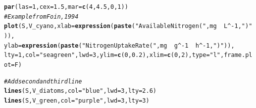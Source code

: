 \documentclass{tufte-handout}\usepackage[]{graphicx}\usepackage[]{xcolor}
\makeatletter
\newcommand{\hlnum}[1]{\textcolor[rgb]{0.686,0.059,0.569}{#1}}%
\newcommand{\hlstr}[1]{\textcolor[rgb]{0.192,0.494,0.8}{#1}}%
\newcommand{\hlcom}[1]{\textcolor[rgb]{0.678,0.584,0.686}{\textit{#1}}}%
\newcommand{\hlopt}[1]{\textcolor[rgb]{0,0,0}{#1}}%
\newcommand{\hlstd}[1]{\textcolor[rgb]{0.345,0.345,0.345}{#1}}%
\newcommand{\hlkwc}[1]{\textcolor[rgb]{0.333,0.667,0.333}{#1}}%
\newcommand{\hlkwd}[1]{\textcolor[rgb]{0.737,0.353,0.396}{\textbf{#1}}}%
\newenvironment{kframe}{%
 \def\at@end@of@kframe{}%
 \ifinner\ifhmode%
  \def\at@end@of@kframe{\end{minipage}}%
  \begin{minipage}{\columnwidth}%
 \fi\fi%
 \def\FrameCommand##1{\hskip\@totalleftmargin \hskip-\fboxsep
 \colorbox{shadecolor}{##1}\hskip-\fboxsep
     \hskip-\linewidth \hskip-\@totalleftmargin \hskip\columnwidth}%
 \MakeFramed {\advance\hsize-\width
   \@totalleftmargin\z@ \linewidth\hsize
   \@setminipage}}%
 {\par\unskip\endMakeFramed%
 \at@end@of@kframe}
\newenvironment{knitrout}{}{} %
\makeatother
\begin{document}
\begin{knitrout}
\color{fgcolor}\begin{kframe}
\begin{alltt}
\hlkwd{par}\hlstd{(}\hlkwc{las}\hlstd{=}\hlnum{1}\hlstd{,} \hlkwc{cex}\hlstd{=}\hlnum{1.5}\hlstd{,} \hlkwc{mar}\hlstd{=}\hlkwd{c}\hlstd{(}\hlnum{4}\hlstd{,}\hlnum{4.5}\hlstd{,}\hlnum{0}\hlstd{,}\hlnum{1}\hlstd{))}
\hlcom{# Example from Foin, 1994}
\hlkwd{plot}\hlstd{(S,V_cyano,} \hlkwc{xlab}\hlstd{=}\hlkwd{expression}\hlstd{(}\hlkwd{paste}\hlstd{(}\hlstr{"Available Nitrogen ("}\hlstd{, mg} \hlopt{~~} \hlstd{L}\hlopt{^-}\hlnum{1}\hlstd{,} \hlstr{")"}\hlstd{)),}
  \hlkwc{ylab}\hlstd{=}\hlkwd{expression}\hlstd{(}\hlkwd{paste}\hlstd{(}\hlstr{"Nitrogen Uptake Rate ( "}\hlstd{, mg} \hlopt{~~} \hlstd{g}\hlopt{^-}\hlnum{1} \hlopt{~~} \hlstd{h}\hlopt{^-}\hlnum{1}\hlstd{,} \hlstr{")"}\hlstd{)),}
        \hlkwc{lty}\hlstd{=}\hlnum{1}\hlstd{,} \hlkwc{col}\hlstd{=}\hlstr{"seagreen"}\hlstd{,} \hlkwc{lwd}\hlstd{=}\hlnum{3}\hlstd{,} \hlkwc{ylim}\hlstd{=}\hlkwd{c}\hlstd{(}\hlnum{0}\hlstd{,}\hlnum{0.2}\hlstd{),} \hlkwc{xlim}\hlstd{=}\hlkwd{c}\hlstd{(}\hlnum{0}\hlstd{,}\hlnum{2}\hlstd{),} \hlkwc{type}\hlstd{=}\hlstr{"l"}\hlstd{,} \hlkwc{frame.plot}\hlstd{=F)}

\hlcom{# Add second and third line}
\hlkwd{lines}\hlstd{(S,V_diatoms,} \hlkwc{col}\hlstd{=}\hlstr{"blue"}\hlstd{,} \hlkwc{lwd}\hlstd{=}\hlnum{3}\hlstd{,} \hlkwc{lty}\hlstd{=}\hlnum{2.6}\hlstd{)}
\hlkwd{lines}\hlstd{(S,V_green,} \hlkwc{col}\hlstd{=}\hlstr{"purple"}\hlstd{,} \hlkwc{lwd}\hlstd{=}\hlnum{3}\hlstd{,} \hlkwc{lty}\hlstd{=}\hlnum{3}\hlstd{)}


\end{alltt}
\end{kframe}
\end{knitrout}
\end{document}
